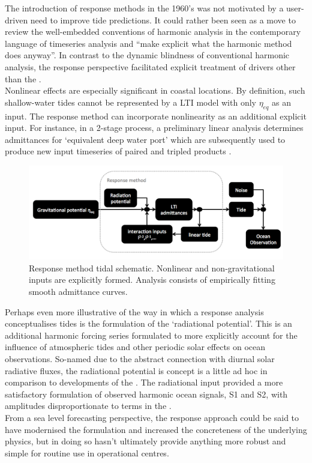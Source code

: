 The introduction of response methods in the 1960's was not motivated by a user-driven need to improve tide predictions.  It could rather been seen as a move to review the well-embedded conventions of harmonic analysis in the contemporary language of timeseries analysis and ``make explicit what the harmonic method does anyway''\citep[pp 540]{Munk:1966ts}.  In contrast to the dynamic blindness of conventional harmonic analysis, the response perspective facilitated explicit treatment of drivers other than the \ATGP{}.\\

Nonlinear effects are especially significant in coastal locations.   By definition, such shallow-water tides cannot be represented by a LTI model with only $\eta_{eq}$ as an input.  The response method can incorporate nonlinearity as an additional explicit input.    For instance,  in a 2-stage process, a preliminary linear analysis determines admittances for `equivalent deep water port' which are subsequently used to produce new input timeseries of paired and tripled products \citep[pp 122]{Pugh:1996uz}.\\

\begin{figure}[h]
\begin{center}
\includegraphics[width=\figwidthBig]{figures/diagrams/response_analysis_flowchart.png}
\caption{Response method tidal schematic.  Nonlinear and non-gravitational inputs are explicitly formed.   Analysis consists of empirically fitting smooth admittance curves.}
\label{fig:response}
\end{center}
\end{figure}

Perhaps even more illustrative of the way in which a response analysis conceptualises tides is the formulation of the `radiational potential'.   This is an additional harmonic forcing series formulated to more explicitly account for the influence of atmospheric tides and other periodic solar effects on ocean observations.	  So-named due to the abstract connection with diurnal solar radiative fluxes, the radiational potential is concept is a little ad hoc in comparison to developments of the \ATGP{}.  The radiational input provided a more satisfactory formulation of observed harmonic ocean signals, S1 and S2, with amplitudes disproportionate to terms in the \ATGP{}.\\
From a sea level forecasting perspective, the response approach could be said to have modernised the formulation and increased the concreteness of the underlying physics, but in doing so hasn't ultimately provide anything more robust and simple for routine use in operational centres.


